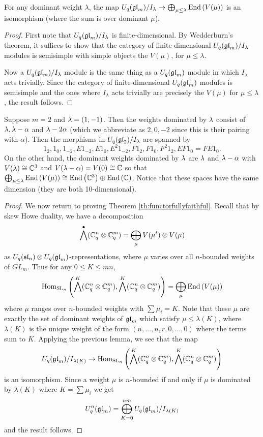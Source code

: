 \documentclass[10pt,leqno]{article}
\begin{document}
\begin{lem}
For any dominant weight $ \lambda $, the map $ U_q({\mathfrak{gl}}_m) / I_\lambda \rightarrow \bigoplus_{\mu \le \lambda} \operatorname{End}\left(V(\mu)\right)$ is an isomorphism (where the sum is over dominant $\mu$).
\end{lem}
\begin{proof}
First note that $U_q({\mathfrak{gl}}_m)/ I_\lambda $ is finite-dimensional.  By Wedderburn's theorem, it suffices to show that the category of finite-dimensional $U_q({\mathfrak{gl}}_m)/I_\lambda$-modules is semisimple with simple objects the $V(\mu)$, for $\mu \le \lambda$.

Now a $U_q({\mathfrak{gl}}_m)/I_\lambda$ module is the same thing as a $U_q({\mathfrak{gl}}_m) $ module in which $ I_\lambda $ acts trivially.  Since the category of finite-dimensional $ U_q({\mathfrak{gl}}_m) $ modules is semisimple and the ones where $ I_\lambda $ acts trivially are precisely the $ V(\mu) $ for $ \mu \le \lambda$, the result follows.
\end{proof}

 Suppose $m=2$ and $\lambda = (1,-1)$. Then the weights dominated by $\lambda$ consist of $\lambda, \lambda - \alpha$ and $\lambda-2\alpha$ (which we abbreviate as $2,0,-2$ since this is their pairing with $\alpha$). Then the morphisms in $U_q({\mathfrak{gl}}_2)/I_\lambda$ are spanned by 
$$1_2, 1_0, 1_{-2}, E 1_{-2}, E1_0, E^2 1_{-2}, F1_2, F1_0, F^2 1_2, EF1_0 = FE1_0.$$
On the other hand, the dominant weights dominated by $\lambda$ are $\lambda$ and $\lambda-\alpha$ with $V(\lambda) \cong {\mathbb{C}}^3$ and $V(\lambda-\alpha)=V(0) \cong {\mathbb{C}}$ so that $\bigoplus_{\mu \le \lambda} \operatorname{End}\left(V(\mu)\right) \cong \operatorname{End}\left({\mathbb{C}}^3\right) \oplus \operatorname{End}\left({\mathbb{C}}\right)$. Notice that these spaces have the same dimension (they are both 10-dimensional). 

\begin{proof}
We now return to proving Theorem \ref{th:functorfullyfaithful}. Recall that by skew Howe duality, we have a decomposition
$$ \bigwedge^\bullet ({\mathbb{C}}_q^n \otimes {\mathbb{C}}_q^m) = \bigoplus_{\mu} V(\mu^t) \otimes V(\mu) $$
as $U_q({\mathfrak{sl}}_n) \otimes U_q({\mathfrak{gl}}_m)$-representations, where $\mu$ varies over all $n$-bounded weights of $ GL_m$. Thus for any $ 0 \le K \le mn $,
$$ \operatorname{Hom}_{{\rm{SL}}_n} \left(\bigwedge^K({\mathbb{C}}_q^n \otimes {\mathbb{C}}_q^m), \bigwedge^K({\mathbb{C}}_q^n \otimes {\mathbb{C}}_q^m)\right) = \bigoplus_{\mu} \operatorname{End}\left(V(\mu)\right) $$
where $ \mu $ ranges over $ n$-bounded weights with $ \sum \mu_i = K $.  Note that these $\mu $ are exactly the set of dominant weights of $ {\mathfrak{gl}}_m $ which satisfy $ \mu \le \lambda(K) $, where $ \lambda(K) $ is the unique weight of the form $(n, \dots, n, r, 0, \dots, 0) $ where the terms sum to $K$.  Applying the previous lemma, we see that the map
$$ U_q({\mathfrak{gl}}_m)/I_{\lambda(K)} \rightarrow \operatorname{Hom}_{{\rm{SL}}_n} \left(\bigwedge^K({\mathbb{C}}_q^n \otimes {\mathbb{C}}_q^m), \bigwedge^K({\mathbb{C}}_q^n \otimes {\mathbb{C}}_q^m)\right) $$
is an isomorphism. Since a weight $ \mu $ is $n$-bounded if and only if $ \mu $ is dominated by $ \lambda(K) $ where $ K = \sum \mu_i $ we get 
$$ U_q^n({\mathfrak{gl}}_m) = \bigoplus_{K=0}^{nm} U_q({\mathfrak{gl}}_m)/I_{\lambda(K)} $$
and the result follows.
\end{proof}
\end{document}
